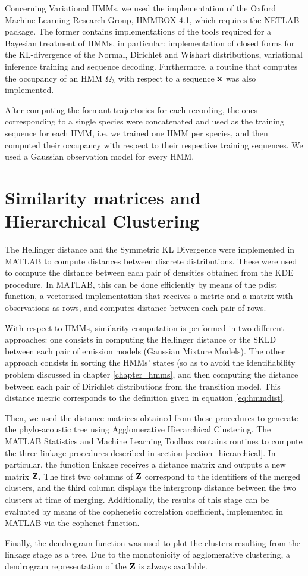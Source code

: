 \documentclass[../main.tex]{subfiles}
\begin{document}
\par Concerning Variational HMMs, we used the implementation of the Oxford Machine Learning Research Group, HMMBOX 4.1, which requires the NETLAB package. The former contains implementations of the tools required for a Bayesian treatment of HMMs, in particular: implementation of closed forms for the KL-divergence of the Normal, Dirichlet and Wishart distributions, variational inference training and sequence decoding. Furthermore, a routine that computes the occupancy of an HMM $\Omega_\lambda$ with respect to a sequence $\mathbf{x}$ was also implemented. 
\par After computing the formant trajectories for each recording, the ones corresponding to a single species were concatenated and used as the training sequence for each HMM, i.e. we trained one HMM per species, and then computed their occupancy with respect to their respective training sequences. We used a Gaussian observation model for every HMM.

\section{Similarity matrices and Hierarchical Clustering}
The Hellinger distance and the Symmetric KL Divergence were implemented in MATLAB to compute distances between discrete distributions. These were used to compute the distance between each pair of densities obtained from the KDE procedure. In MATLAB, this can be done efficiently by means of the pdist function, a vectorised implementation that receives a metric and a matrix with observations as rows, and computes distance between each pair of rows.
\par With respect to HMMs, similarity computation is performed in two different approaches: one consists in computing the Hellinger distance or the SKLD between each pair of emission models (Gaussian Mixture Models). The other approach consists in sorting the HMMs' states (so as to avoid the identifiability problem discussed in chapter \ref{chapter_hmms}, and then computing the distance between each pair of Dirichlet distributions from the transition model. This distance metric corresponds to the definition given in equation \ref{eq:hmmdist}.
\par Then, we used the distance matrices obtained from these procedures to generate the phylo-acoustic tree using Agglomerative Hierarchical Clustering. The MATLAB Statistics and Machine Learning Toolbox contains routines to compute the three linkage procedures described in section \ref{section_hierarchical}. In particular, the function linkage receives a distance matrix and outputs a new matrix $\mathbf{Z}$. The first two columns of $\mathbf{Z}$ correspond to the identifiers of the merged clusters, and the third column displays the intergroup distance between the two clusters at time of merging. Additionally, the results of this stage can be evaluated by means of the cophenetic correlation coefficient, implemented in MATLAB via the cophenet function.
\par Finally, the dendrogram function was used to plot the clusters resulting from the linkage stage as a tree. Due to the monotonicity of agglomerative clustering, a dendrogram representation of the $\mathbf{Z}$ is always available. 
\end{document}
